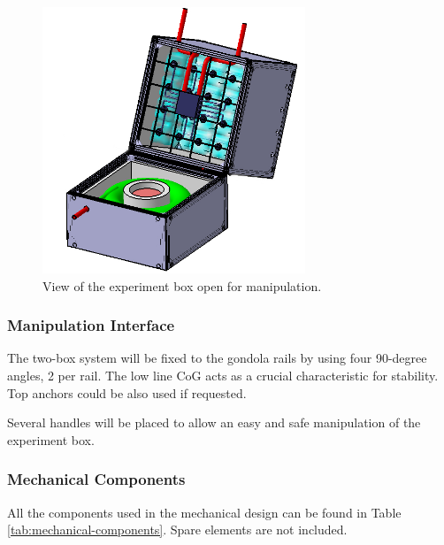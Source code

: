 
\begin{figure}[!ht]
    \centering
    \includegraphics[width=0.7\textwidth]{4-experiment-design/img/open_box.jpg}
    \caption{View of the experiment box open for manipulation.}
    \label{open_box_2}
\end{figure}


\subsubsection{Manipulation Interface}

The two-box system will be fixed to the gondola rails by using four 90-degree angles, 2 per rail. The low line CoG acts as a crucial characteristic for stability. Top anchors could be also used if requested. 


Several handles will be placed to allow an easy and safe manipulation of the experiment box. 


\subsubsection{Mechanical Components}

All the components used in the mechanical design can be found in Table \ref{tab:mechanical-components}. Spare elements are not included. 


\raggedbottom